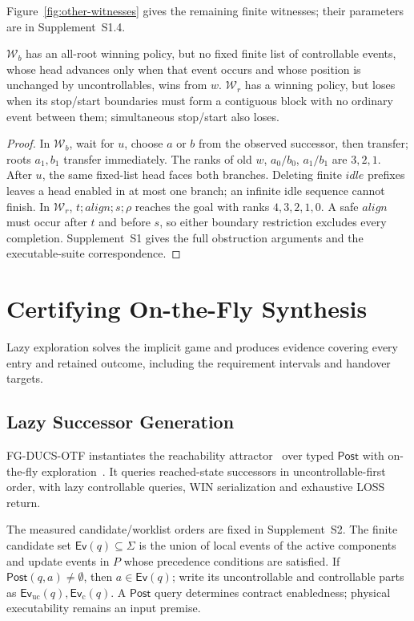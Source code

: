 \documentclass[acmsmall,screen,review,anonymous]{acmart}
\newcommand{\Post}{\mathsf{Post}}
\newcommand{\Ev}{\mathsf{Ev}}
\begin{document}
Figure~\ref{fig:other-witnesses} gives the remaining finite witnesses; their parameters are in Supplement~S1.4.

\FloatBarrier

\begin{proposition}
\label{prop:other-separations}
$\mathcal W_b$ has an all-root winning policy, but no fixed finite list of controllable events, whose head advances only when that event occurs and whose position is unchanged by uncontrollables, wins from $w$. $\mathcal W_r$ has a winning policy, but loses when its stop/start boundaries must form a contiguous block with no ordinary event between them; simultaneous stop/start also loses.
\end{proposition}
\begin{proof}
In $\mathcal W_b$, wait for $u$, choose $a$ or $b$ from the observed successor, then transfer; roots $a_1,b_1$ transfer immediately. The ranks of old $w$, $a_0/b_0$, $a_1/b_1$ are $3,2,1$. After $u$, the same fixed-list head faces both branches. Deleting finite $idle$ prefixes leaves a head enabled in at most one branch; an infinite idle sequence cannot finish. In $\mathcal W_r$, $t;align;s;\rho$ reaches the goal with ranks $4,3,2,1,0$. A safe $align$ must occur after $t$ and before $s$, so either boundary restriction excludes every completion. Supplement~S1 gives the full obstruction arguments and the executable-suite correspondence.
\end{proof}

\section{Certifying On-the-Fly Synthesis}
Lazy exploration solves the implicit game and produces evidence covering every entry and retained outcome, including the requirement intervals and handover targets.
\label{sec:algorithm}

\subsection{Lazy Successor Generation}

FG-DUCS-OTF instantiates the reachability attractor~\cite{Cimatti1998StrongPlanning} over typed $\Post$ with on-the-fly exploration~\cite{TripakisAltisen1999}. It queries reached-state successors in uncontrollable-first order, with lazy controllable queries, WIN serialization and exhaustive LOSS return.

The measured candidate/worklist orders are fixed in Supplement~S2. The finite candidate set $\Ev(q)\subseteq\Sigma$ is the union of local events of the active components and update events in $P$ whose precedence conditions are satisfied.
If $\Post(q,a)\neq\emptyset$, then $a\in\Ev(q)$; write its uncontrollable and controllable parts as $\Ev_{\mathrm{uc}}(q),\Ev_{\mathrm{c}}(q)$. A $\Post$ query determines contract enabledness; physical executability remains an input premise.
\end{document}
